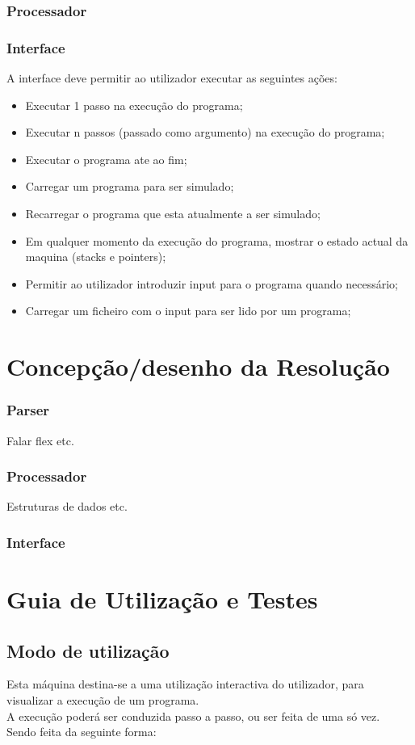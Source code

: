 \documentclass{report}
\begin{document}
\subsection{Processador}
\subsection{Interface}
\quad A interface deve permitir ao utilizador executar as seguintes ações:
\begin{itemize}
\item Executar 1 passo na execução do programa;
\item Executar n passos (passado como argumento) na execução do programa;
\item Executar o programa ate ao fim;
\item Carregar um programa para ser simulado;
\item Recarregar o programa que esta atualmente a ser simulado;
\item Em qualquer momento da execução do programa, mostrar o estado actual da maquina (stacks e pointers);
\item Permitir ao utilizador introduzir input para o programa quando necessário;
\item Carregar um ficheiro com o input para ser lido por um programa;
\end{itemize}

\chapter{Concepção/desenho da Resolução}
\subsection{Parser}
\quad Falar flex etc.
\subsection{Processador}
\quad Estruturas de dados etc.
\subsection{Interface}

\chapter{Guia de Utilização e Testes}
\section{Modo de utilização}
\quad Esta máquina destina-se a uma utilização interactiva do utilizador, para visualizar a execução de um programa.\\
A execução poderá ser conduzida passo a passo, ou ser feita de uma só vez.\\
Sendo feita da seguinte forma:\\
\end{document}
